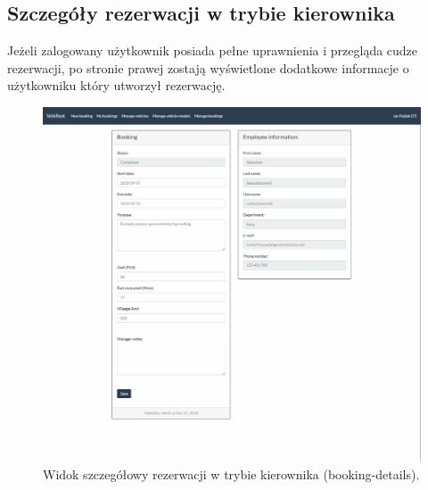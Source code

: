 \documentclass[eng,printmode,openany]{mgr}
\begin{document}
\begin{appendices}
		\section{Szczegóły rezerwacji w trybie kierownika}
		Jeżeli zalogowany użytkownik posiada pełne uprawnienia i przegląda cudze rezerwacji, po stronie prawej zostają wyświetlone dodatkowe informacje o użytkowniku który utworzył rezerwację.
		\begin{figure}[H]
			\centering
			\includegraphics[width=\textwidth]{images/views/booking-detail-manager.png}
			\caption{Widok szczegółowy rezerwacji w trybie kierownika (booking-details).}		
		\end{figure}
		
		\newpage

\end{appendices}
\end{document}
